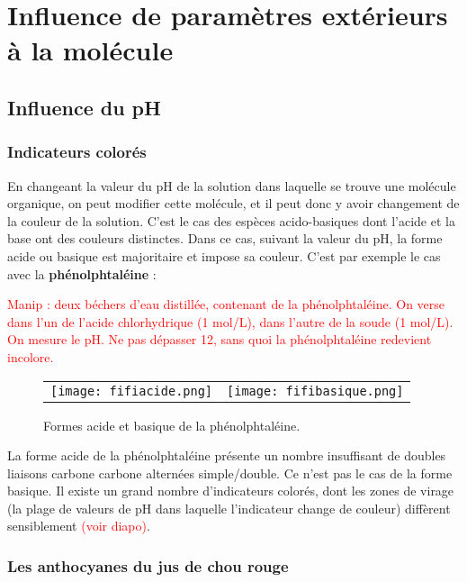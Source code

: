 \documentclass[11pt,a4paper]{report}
\begin{document}
\newpage
\section{Influence de paramètres extérieurs à la molécule}\label{sec:2}

\subsection{Influence du pH}

\subsubsection*{Indicateurs colorés}

En changeant la valeur du pH de la solution dans laquelle se trouve une molécule organique, on peut
modifier cette molécule, et il peut donc y avoir changement de la couleur de la solution. C'est le cas
des espèces acido-basiques dont l'acide et la base ont des couleurs distinctes. Dans ce cas, suivant
la valeur du pH, la forme acide ou basique est majoritaire et impose sa couleur. C'est par exemple le cas avec la \textbf{phénolphtaléine} :

\textcolor{red}{Manip : deux béchers d'eau distillée, contenant de la phénolphtaléine. On verse dans l'un de l'acide chlorhydrique (1 mol/L), dans l'autre de la soude (1 mol/L). On mesure le pH. Ne pas dépasser 12, sans quoi la phénolphtaléine redevient incolore.}

\begin{figure}[h!]
	\begin{center}
		\begin{tabular}{cc}
  		\texttt{[image: fifiacide.png]} &
   		\texttt{[image: fifibasique.png]}\\
	\end{tabular}
	\caption{Formes acide et basique de la phénolphtaléine.}
	\end{center}
\end{figure}

La forme acide de la phénolphtaléine présente un nombre insuffisant de doubles liaisons carbone carbone alternées simple/double. Ce n'est pas le cas de la forme basique. Il existe un grand nombre d'indicateurs colorés, dont les zones de virage (la plage de valeurs de pH dans laquelle l'indicateur change de couleur) diffèrent sensiblement \textcolor{red}{(voir diapo)}.

\subsubsection*{Les anthocyanes du jus de chou rouge}
\end{document}
